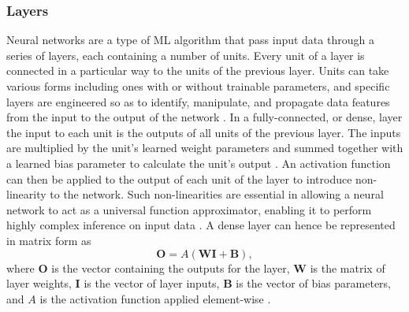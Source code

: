 \documentclass[12pt]{article}
\begin{document}
\subsubsection{Layers}
Neural networks are a type of ML algorithm that pass input data through a series of layers, each containing a number of units. Every unit of a layer is connected in a particular way to the units of the previous layer. Units can take various forms including ones with or without trainable parameters, and specific layers are engineered so as to identify, manipulate, and propagate data features from the input to the output of the network \cite{Haykin98}. In a fully-connected, or dense, layer the input to each unit is the outputs of all units of the previous layer. The inputs are multiplied by the unit's learned weight parameters and summed together with a learned bias parameter to calculate the unit's output \cite{Goodfellow16, Haykin98}. An activation function can then be applied to the output of each unit of the layer to introduce non-linearity to the network. Such non-linearities are essential in allowing a neural network to act as a universal function approximator, enabling it to perform highly complex inference on input data \cite{Hornik89}. A dense layer can hence be represented in matrix form as
\begin{equation}
\bm{O}=A(\bm{W}\bm{I}+\bm{B}), \label{dense}
\end{equation}
where $\bm{O}$ is the vector containing the outputs for the layer, $\bm{W}$ is the matrix of layer weights, $\bm{I}$ is the vector of layer inputs, $\bm{B}$ is the vector of bias parameters, and $A$ is the activation function applied element-wise \cite{Goodfellow16, Haykin98}.
\end{document}
